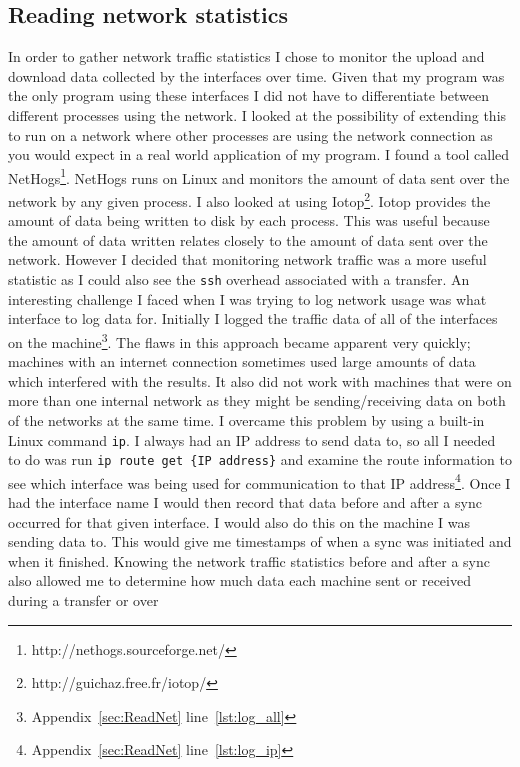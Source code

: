 \documentclass[12pt]{article}
\begin{document}
\subsection{Reading network statistics}
\label{sec:iface_mon}
In order to gather network traffic statistics
I chose to monitor the upload and download
data collected by the interfaces over time.
Given that my program was the only program
using these interfaces I did not have to
differentiate between different processes
using the network.
I looked at the possibility of extending this
to run on a network where other processes
are using the network connection as you
would expect in a real world application
of my program. I found a tool called
NetHogs\footnote{http://nethogs.sourceforge.net/}.
NetHogs runs on Linux and monitors the
amount of data sent over the network by any
given process. I also looked at 
using Iotop\footnote{http://guichaz.free.fr/iotop/}.
Iotop provides the amount of data being written
to disk by each process. This was useful because
the amount of data written relates closely to the amount
of data sent over the network.
However I decided that monitoring
network traffic was a more useful statistic
as I could also see the \texttt{ssh} overhead
associated with a transfer.
An interesting challenge I faced when I was trying
to log network usage was what interface to log
data for. Initially I logged the traffic data of all of the
interfaces on the machine\footnote{Appendix~\ref{sec:ReadNet}
line~\ref{lst:log_all}}. The flaws in this approach
became apparent very quickly; machines with an
internet connection sometimes used large amounts
of data which interfered with the results. It also did not work
with machines that were on more than one internal
network as they might be sending/receiving data
on both of the networks at the same time. I overcame
this problem by using a built-in Linux command \texttt{ip}.
I always had an IP address to send data to, so all
I needed to do was run \texttt{ip route get \{IP address\}}
and examine the route information to see which interface
was being used for communication to that IP 
address\footnote{Appendix~\ref{sec:ReadNet} line~\ref{lst:log_ip}}.
Once I had the interface name I would then record that
data before and after a sync occurred for that given
interface. I would also do this on the machine I
was sending data to. This would give me timestamps
of when a sync was initiated and when it finished.
Knowing the network traffic statistics before and after
a sync also allowed me to determine how much data each
machine sent or received during a transfer or over
\end{document}
